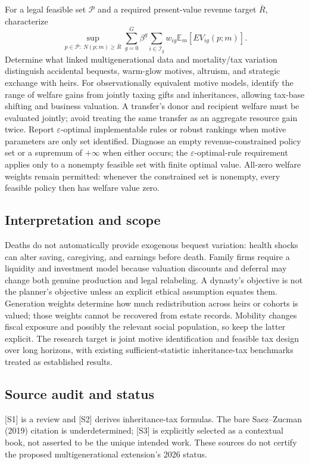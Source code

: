\documentclass[11pt,a4paper]{article}
\begin{document}
For a legal feasible set $\mathcal P$ and a required present-value revenue target $\bar R$, characterize
\[
 \sup_{p\in\mathcal P:\ N(p;m)\geq\bar R}
 \sum_{g=0}^{G}\beta^g\sum_{i\in\mathcal I_g}w_{ig}\mathbb E_m[EV_{ig}(p;m)].
\]
Determine what linked multigenerational data and mortality/tax variation distinguish accidental bequests, warm-glow motives, altruism, and strategic exchange with heirs. For observationally equivalent motive models, identify the range of welfare gains from jointly taxing gifts and inheritances, allowing tax-base shifting and business valuation. A transfer's donor and recipient welfare must be evaluated jointly; avoid treating the same transfer as an aggregate resource gain twice. Report $\varepsilon$-optimal implementable rules or robust rankings when motive parameters are only set identified. Diagnose an empty revenue-constrained policy set or a supremum of $+\infty$ when either occurs; the $\varepsilon$-optimal-rule requirement applies only to a nonempty feasible set with finite optimal value. All-zero welfare weights remain permitted: whenever the constrained set is nonempty, every feasible policy then has welfare value zero.

\subsection*{Interpretation and scope}
Deaths do not automatically provide exogenous bequest variation: health shocks can alter saving, caregiving, and earnings before death. Family firms require a liquidity and investment model because valuation discounts and deferral may change both genuine production and legal relabeling. A dynasty's objective is not the planner's objective unless an explicit ethical assumption equates them. Generation weights determine how much redistribution across heirs or cohorts is valued; those weights cannot be recovered from estate records. Mobility changes fiscal exposure and possibly the relevant social population, so keep the latter explicit. The research target is joint motive identification and feasible tax design over long horizons, with existing sufficient-statistic inheritance-tax benchmarks treated as established results.

\subsection*{Source audit and status}
[S1] is a review and [S2] derives inheritance-tax formulas. The bare Saez--Zucman (2019) citation is underdetermined; [S3] is explicitly selected as a contextual book, not asserted to be the unique intended work. These sources do not certify the proposed multigenerational extension's 2026 status.
\end{document}
